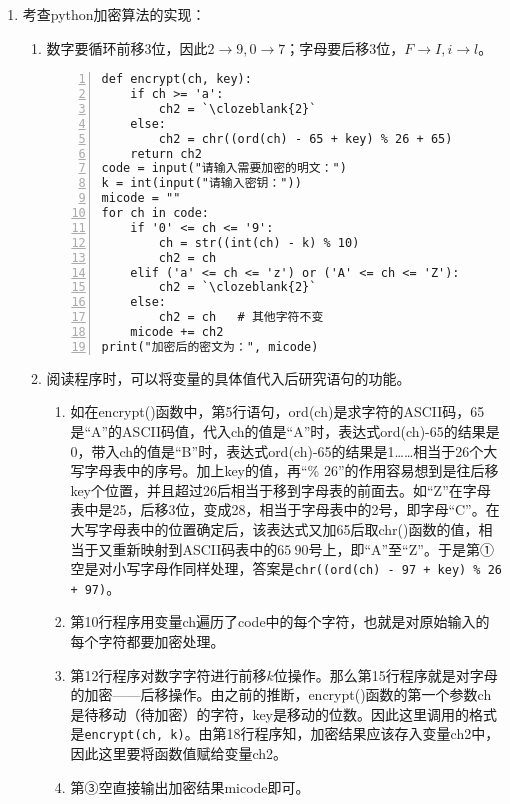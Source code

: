 \begin{enumerate}
\item 考查python加密算法的实现：
	\begin{enumerate}[label=$(\arabic*)$]
	\item 数字要循环前移3位，因此$2 \to 9, 0 \to 7$；字母要后移3位，$F \to I, i \to l$。
\setcounter{qnumber}{1}
\begin{lstlisting}[numbers=left]
def encrypt(ch, key):
    if ch >= 'a':
        ch2 = `\clozeblank{2}`
    else:
        ch2 = chr((ord(ch) - 65 + key) % 26 + 65)
    return ch2
code = input("请输入需要加密的明文：")
k = int(input("请输入密钥："))
micode = ""
for ch in code:
    if '0' <= ch <= '9':
        ch = str((int(ch) - k) % 10)
        ch2 = ch
    elif ('a' <= ch <= 'z') or ('A' <= ch <= 'Z'):
        ch2 = `\clozeblank{2}`
    else:
        ch2 = ch   # 其他字符不变
    micode += ch2
print("加密后的密文为：", micode)
\end{lstlisting}
	\item 阅读程序时，可以将变量的具体值代入后研究语句的功能。
		\begin{enumerate}[label=$(\alph*)$]
		\item 如在encrypt()函数中，第5行语句，ord(ch)是求字符的ASCII码，65是“A”的ASCII码值，代入ch的值是“A”时，表达式ord(ch)-65的结果是0，带入ch的值是“B”时，表达式ord(ch)-65的结果是1……相当于26个大写字母表中的序号。加上key的值，再“\% 26”的作用容易想到是往后移key个位置，并且超过26后相当于移到字母表的前面去。如“Z”在字母表中是25，后移3位，变成28，相当于字母表中的2号，即字母“C”。在大写字母表中的位置确定后，该表达式又加65后取chr()函数的值，相当于又重新映射到ASCII码表中的$65~90$号上，即“A”至“Z”。于是第①空是对小写字母作同样处理，答案是\lstinline|chr((ord(ch) - 97 + key) % 26 + 97)|。
		\item 第10行程序用变量ch遍历了code中的每个字符，也就是对原始输入的每个字符都要加密处理。
		\item 第12行程序对数字字符进行前移$k$位操作。那么第15行程序就是对字母的加密——后移操作。由之前的推断，encrypt()函数的第一个参数ch是待移动（待加密）的字符，key是移动的位数。因此这里调用的格式是\lstinline|encrypt(ch, k)|。由第18行程序知，加密结果应该存入变量ch2中，因此这里要将函数值赋给变量ch2。
		\item 第③空直接输出加密结果micode即可。
		\end{enumerate}	
	\end{enumerate}


\end{enumerate}


\newpage

